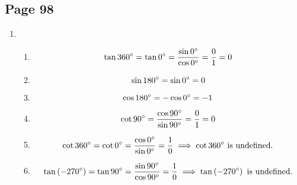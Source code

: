 \documentclass{article}
\newenvironment{solutions}[1]
{\subsection*{#1}
 \begin{enumerate}[leftmargin=1.5em]}
{\end{enumerate}}
\newcommand{\solution}{\item}
\newenvironment{subsolutions}
{\begin{enumerate}}
{\end{enumerate}}
\newcommand{\subsolution}{\item}
\begin{document}
\begin{solutions}{Page 98}
\begin{subsolutions}

\[
\tan\left(-30\degree\right) = \dfrac{\sin\left(-30\degree\right)}{\cos\left(-30\degree\right)} = \dfrac{-\sin{30\degree}}{\cos{30\degree}} = -\dfrac{1/2}{\sqrt{3}/2} = -\dfrac{1}{\sqrt{3}}
\]

\end{subsolutions}

\solution %
\begin{subsolutions}
\subsolution %
\[
\tan{360\degree} = \tan{0\degree} = \dfrac{\sin{0\degree}}{\cos{0\degree}} = \dfrac{0}{1} = 0
\]
\subsolution %
\[
\sin{180\degree} = \sin{0\degree} = 0
\]
\subsolution %
\[
\cos{180\degree} = -\cos{0\degree} = -1
\]
\subsolution %
\[
\cot{90\degree} = \dfrac{\cos{90\degree}}{\sin{90\degree}} = \dfrac{0}{1} = 0
\]
\subsolution %
\[
\cot{360\degree} = \cot{0\degree} = \dfrac{\cos{0\degree}}{\sin{0\degree}} = \dfrac{1}{0} \implies \cot{360\degree} \text{ is undefined.}
\]
\subsolution %
\[
\tan\left(-270\degree\right) = \tan{90\degree} = \dfrac{\sin{90\degree}}{\cos{90\degree}} = \dfrac{1}{0} \implies \tan\left(-270\degree\right) \text{ is undefined.}
\]
\end{subsolutions}
\end{solutions}
\end{document}
